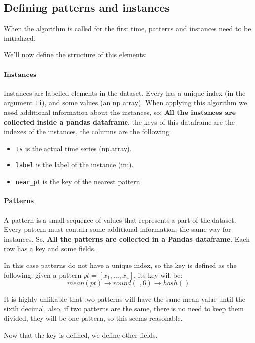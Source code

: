 \subsection{Defining patterns and instances}
When the algorithm is called for the first time, patterns and instances need to be initialized.

We'll now define the structure of this elements:

\paragraph{Instances}
Instances are labelled elements in the dataset. Every has a unique index (in the argument \texttt{Li}), and some 
values (an np array). When applying this algorithm we need additional information about the instances, so:
\textbf{All the instances are collected inside a pandas dataframe}, the keys of this dataframe are the indexes of 
the instances, the columns are the following:

\begin{itemize}
    \item \texttt{ts} is the actual time series (np.array).
    \item \texttt{label} is the label of the instance (int).
    \item \texttt{near\_pt} is the key of the nearest pattern
\end{itemize}

\paragraph{Patterns}
A pattern is a small sequence of values that represents a part of the dataset. Every pattern must contain 
some additional information, the same way for instances. So, \textbf{All the patterns are collected in a 
Pandas dataframe}. Each row has a key and some fields.

In this case patterns do not have a unique index, so the key is defined as the following: given a pattern
$pt = [x_1, \dots, x_n]$, its key will be:
$$
    mean(pt) \longrightarrow round(\,\, ,6) \longrightarrow hash()
$$

It is highly unlikable that two patterns will have the same mean value until the sixth decimal, also, 
if two patterns are the same, there is no need to keep them divided, they will be one pattern, so 
this seems reasonable.

Now that the key is defined, we define other fields.

